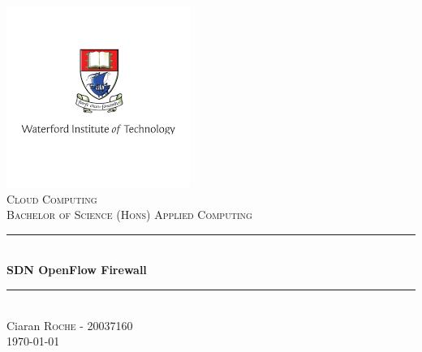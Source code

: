 \begin{titlepage}

\newcommand{\HRule}{\rule{\linewidth}{0.5mm}}

\center

\includegraphics{images/logo.png}\\
\textsc{\Large Cloud Computing}\\[0.5cm]
\textsc{\large Bachelor of Science (Hons) Applied Computing }\\[0.5cm] 


\HRule \\[0.4cm]
{ \huge \bfseries SDN OpenFlow Firewall}\\[0.4cm] 
\HRule \\[1.5cm]

\Large Ciaran \textsc{Roche} - 20037160\\[3cm]


{\large \today}\\[1cm]

\vfill 

\end{titlepage}

